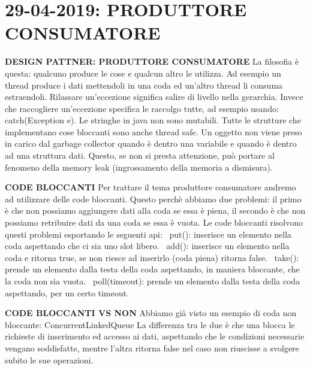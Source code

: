

\newpage
\section{29-04-2019: PRODUTTORE CONSUMATORE}

\noindent \textbf{DESIGN PATTNER: PRODUTTORE CONSUMATORE} \newline
La filosofia è questa: qualcuno produce le cose e qualcun altro le utilizza. Ad esempio un thread produce i dati mettendoli in una coda ed un'altro thread li consuma estraendoli. \newline
Rilassare un'eccezione significa salire di livello nella gerarchia. Invece che raccogliere un'eccezione specifica le raccolgo tutte, ad esempio usando: catch(Exception e). \newline
Le stringhe in java non sono mutabili. \newline
Tutte le strutture che implementano cose bloccanti sono anche thread safe. \newline
Un oggetto non viene preso in carico dal garbage collector quando è dentro una variabile e quando è dentro ad una struttura dati. Questo, se non si presta attenzione, può portare al fenomeno della memory leak (ingrossamento della memoria a dismisura). \newline

\noindent \textbf{CODE BLOCCANTI} \newline
Per trattare il tema produttore consumatore andremo ad utilizzare delle code bloccanti. Questo perchè abbiamo due problemi: il primo è che non possiamo aggiungere dati alla coda se essa è piena, il secondo è che non possiamo retribuire dati da una coda se essa è vuota. Le code bloccanti risolvono questi problemi esportando le seguenti api: \newline
\textbullet\ put(): inserisce un elemento nella coda aspettando che ci sia uno slot libero. \newline
\textbullet\ add(): inserisce un elemento nella coda e ritorna true, se non riesce ad inserirlo (coda piena) ritorna false. \newline
\textbullet\ take(): prende un elemento dalla testa della coda aspettando, in maniera bloccante, che la coda non sia vuota. \newline
\textbullet\ poll(timeout): prende un elemento dalla testa della coda aspettando, per un certo timeout.\newline

\noindent \textbf{CODE BLOCCANTI VS NON } \newline
Abbiamo già visto un esempio di coda non bloccante: ConcurrentLinkedQueue \newline
La differenza tra le due è che una blocca le richieste di inserimento ed accesso ai dati, aspettando che le condizioni necessarie vengano soddisfatte, mentre l'altra ritorna false nel caso non riuscisse a svolgere subito le sue operazioni.\newline

